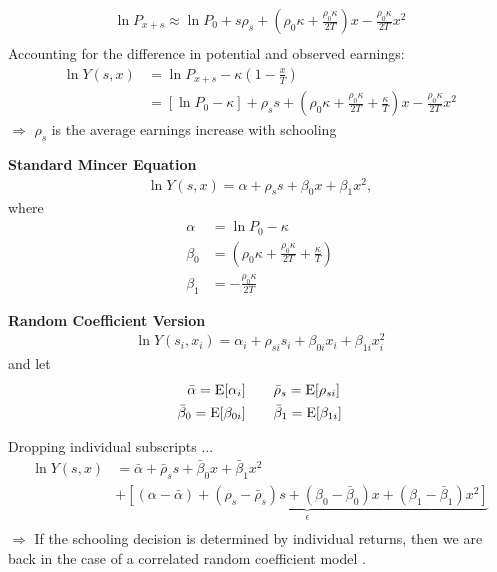 \begin{frame}
 \begin{align*}
 \ln P_{x + s}  \approx \ln P_0 + s\rho_s + \left(\rho_0 \kappa + \frac{\rho_0\kappa}{2T}\right)x - \frac{\rho_0\kappa}{2T} x^2 \\
 \end{align*}
Accounting for the difference in potential and observed earnings:
\begin{align*}
\ln Y(s, x) & = \ln P_{x + s} - \kappa\left(1 - \frac{x}{T}\right) \\
            & = [\ln P_0 - \kappa] + \rho_s s + \left(\rho_0\kappa + \frac{\rho_0\kappa}{2T} + \frac{\kappa}{T}\right) x - \frac{\rho_0\kappa}{2T}x^2
\end{align*}
$\Rightarrow$ $\rho_s$ is the average earnings increase with schooling
\end{frame}

\begin{frame}
\textbf{Standard Mincer Equation}
\begin{align*}
\ln Y(s, x) = \alpha + \rho_s s + \beta_0 x + \beta_1 x^2,
\end{align*}
where
\begin{align*}
\alpha & =\ln P_0 - \kappa \\
\beta_0 & = \left(\rho_0\kappa + \frac{\rho_0\kappa}{2T} + \frac{\kappa}{T}\right) \\
\beta_1 & = -\frac{\rho_0\kappa}{2T}
\end{align*}
\end{frame}

\begin{frame}
\textbf{Random Coefficient Version}
\begin{align*}
\ln Y(s_i, x_i) = \alpha_{i} + \rho_{si} s_i + \beta_{0i} x_i + \beta_{1i} x_i^2
\end{align*}
and let
\begin{align*}
\bar{\alpha} = \mathrm{E}[\alpha_i] &\qquad \bar{\rho}_s = \mathrm{E}[\rho_{si}]\\
\bar{\beta}_0 = \mathrm{E}[\beta_{0i}]&\qquad \bar{\beta}_1 = \mathrm{E}[\beta_{1i}]
\end{align*}
\end{frame}


\begin{frame}
Dropping individual subscripts ...
\begin{align*}
\ln Y(s, x) & = \bar{\alpha} + \bar{\rho}_s s + \bar{\beta}_{0} x + \bar{\beta}_{1} x^2 \\
                & + \underbrace{[(\alpha - \bar{\alpha}) + (\rho_s - \bar{\rho}_s) s + (\beta_0 - \bar{\beta}_0)x + (\beta_1 - \bar{\beta}_1)x^2 ]}_{\epsilon}\\
\end{align*}
$\Rightarrow$ If the schooling decision is determined by individual returns, then we are back in the case of a correlated random coefficient model \citep{Heckman.2006d}.
\end{frame}





